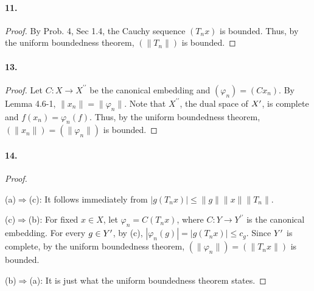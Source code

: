   \paragraph{11.}
  \begin{proof}
    By Prob. 4, Sec 1.4, the Cauchy sequence $(T_nx)$ is bounded. Thus, by the
    uniform boundedness theorem, $(\|T_n\|)$ is bounded.
  \end{proof}
  
  \paragraph{13.}
  \begin{proof}
    Let $C:X\to X^{\prime\prime}$ be the canonical embedding and $(\varphi_n)=
    (Cx_n)$. By Lemma 4.6-1, $\|x_n\|=\|\varphi_n\|$. Note that $X^{\prime
    \prime}$, the dual space of $X^\prime$, is complete and $f(x_n)=\varphi_n(f)$.
    Thus, by the uniform boundedness theorem, $(\|x_n\|)=(\|\varphi_n\|)$ is
    bounded.
  \end{proof}
  
  \paragraph{14.}
  \begin{proof}
    $\,$\par
    (a)$\Rightarrow$(c): It follows immediately from $|g(T_nx)|\le\|g\|\|x\|
    \|T_n\|$.\par
    (c)$\Rightarrow$(b): For fixed $x\in X$, let $\varphi_n=C(T_nx)$, where $C:
    Y\to Y^{\prime\prime}$ is the canonical embedding. For every $g\in Y^\prime$, by
    (c), $|\varphi_n(g)|=|g(T_nx)|\le c_g$. Since $Y^\prime$ is complete, by the
    uniform boundedness theorem, $(\|\varphi_n\|)=(\|T_nx\|)$ is bounded.\par
    (b)$\Rightarrow$(a): It is just what the uniform boundedness theorem states.
  \end{proof}




















